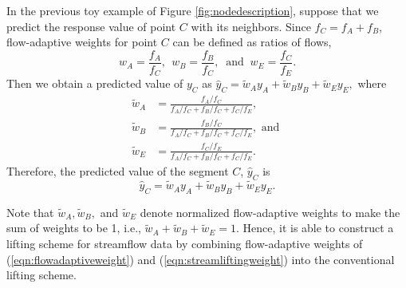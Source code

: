 \documentclass[11pt,titlepage]{article}
\begin{document}






In the previous toy example of Figure \ref{fig:nodedescription}, suppose that we predict the response value of point $C$ with its neighbors. Since $f_{C}= f_{A}+ f_{B}$, flow-adaptive weights for point $C$ can be defined as ratios of flows, 
\begin{equation}
w_{A} = \frac{f_{A}}{f_{C}},~~w_{B}=\frac{f_{B}}{f_{C}}, ~\text{ and }~ w_{E}=\frac{f_{C}}{f_{E}}.
\label{eqn:flowadaptiveweight}
\end{equation}
Then we obtain a predicted value of $y_{C}$ as $\hat{y}_{C} = \tilde{w}_{A}y_{A} + \tilde{w}_{B}y_{B} + \tilde{w}_{E}y_{E},$  where
\begin{align}
\tilde{w}_{A} &= \frac{f_{A}/f_{C}}{f_{A}/f_{C} + f_{B}/f_{C} + f_{C}/f_{E}},\nonumber\\
\tilde{w}_{B} &= \frac{f_{B}/f_{C}}{f_{A}/f_{C} + f_{B}/f_{C} + f_{C}/f_{E}}, \text{ and } \label{eqn:streamliftingweight}\\
\tilde{w}_{E} &= \frac{f_{C}/f_{E}}{f_{A}/f_{C} + f_{B}/f_{C} + f_{C}/f_{E}}.\nonumber
\end{align}
Therefore, the predicted value of the segment $C$, $\hat{y}_{C}$ is
\begin{equation}
\hat{y}_{C}  = \tilde{w}_{A}y_{A} + \tilde{w}_{B}y_{B} + \tilde{w}_{E}y_{E}.
\label{eqn:sliftingprediction}
\end{equation}

Note that $\tilde{w}_A, \tilde{w}_B,$ and $\tilde{w}_E$ denote normalized flow-adaptive weights to make the sum of weights to be 1, i.e., $\tilde{w}_A + \tilde{w}_B + \tilde{w}_E = 1$. Hence, it is able to construct a lifting scheme for streamflow data by combining flow-adaptive weights of (\ref{eqn:flowadaptiveweight}) and (\ref{eqn:streamliftingweight}) into the conventional lifting scheme. %
\end{document}
